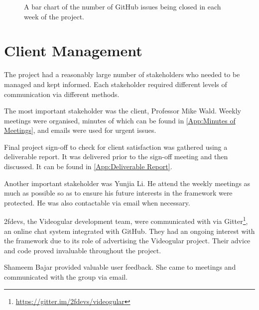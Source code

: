 \begin{figure}
\centering
{}
  \caption{A bar chart of the number of GitHub issues being closed in each week of the project.}
  \label{fig:tasksweek}
\end{figure}

\section{Client Management}
\label{Section:Client Management}

The project had a reasonably large number of stakeholders who needed to be managed and kept informed. Each stakeholder required different levels of communication via different methods.

The most important stakeholder was the client, Professor Mike Wald. Weekly meetings were organised, minutes of which can be found in \cref{App:Minutes of Meetings}, and emails were used for urgent issues.

Final project sign-off to check for client satisfaction was gathered using a deliverable report. It was delivered prior to the sign-off meeting and then discussed. It can be found in \cref{App:Deliverable Report}.

Another important stakeholder was Yunjia Li. He attend the weekly meetings as much as possible so as to ensure his future interests in the framework were protected. He was also contactable via email when necessary.

2fdevs, the Videogular development team, were communicated with via Gitter\footnote{\url{https://gitter.im/2fdevs/videogular}}, an online chat system integrated with GitHub. They had an ongoing interest with the framework due to its role of advertising the \gls{Videogular} project. Their advice and code proved invaluable throughout the project.

Shameem Bajar provided valuable user feedback. She came to meetings and communicated with the group via email.


